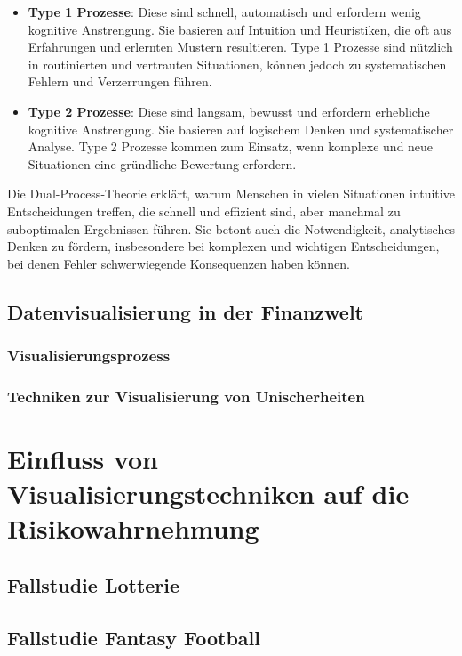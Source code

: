 \begin{itemize}
    \item \textbf{Type 1 Prozesse}: Diese sind schnell, automatisch und erfordern wenig kognitive Anstrengung. 
    Sie basieren auf Intuition und Heuristiken, die oft aus Erfahrungen und erlernten Mustern resultieren. 
    Type 1 Prozesse sind nützlich in routinierten und vertrauten Situationen, können jedoch zu systematischen 
    Fehlern und Verzerrungen führen.
    \item \textbf{Type 2 Prozesse}: Diese sind langsam, bewusst und erfordern erhebliche kognitive Anstrengung. 
    Sie basieren auf logischem Denken und systematischer Analyse. Type 2 Prozesse kommen zum Einsatz, wenn komplexe 
    und neue Situationen eine gründliche Bewertung erfordern.
\end{itemize}

Die Dual-Process-Theorie erklärt, warum Menschen in vielen Situationen intuitive Entscheidungen treffen, die schnell und effizient 
sind, aber manchmal zu suboptimalen Ergebnissen führen. Sie betont auch die Notwendigkeit, analytisches Denken zu fördern, 
insbesondere bei komplexen und wichtigen Entscheidungen, bei denen Fehler schwerwiegende Konsequenzen haben können.


\subsection{Datenvisualisierung in der Finanzwelt}
\subsubsection{Visualisierungsprozess}
\subsubsection{Techniken zur Visualisierung von Unischerheiten}
\cite{Joslyn2021}

\section{Einfluss von Visualisierungstechniken auf die Risikowahrnehmung}
\subsection{Fallstudie Lotterie}
\cite{Larcher2020}
\cite{Pang1997}
\cite{Kerr2023}
\cite{Brodlie2012ARO}
\cite{Haber1990}
\subsection{Fallstudie Fantasy Football}

